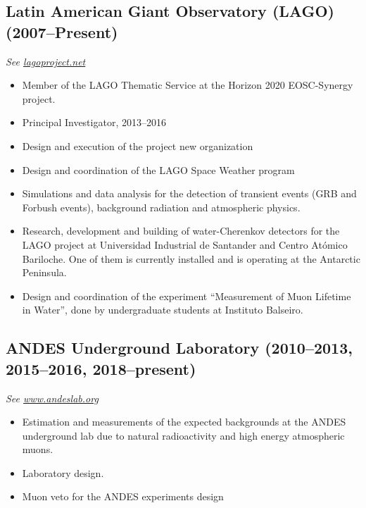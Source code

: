 \subsection*{Latin American Giant Observatory (LAGO) (2007--Present)}
{\small{\textit{See \href{http://lagoproject.net}{lagoproject.net}}}}
\begin{itemize}
\item Member of the LAGO Thematic Service at the Horizon 2020 EOSC-Synergy project.
\item Principal Investigator, 2013--2016
\item Design and execution of the project new organization
\item Design and coordination of the LAGO Space Weather program
\item Simulations and data analysis for the detection of transient events
(GRB and Forbush events), background radiation and atmospheric physics.
\item Research, development and building of water-Cherenkov detectors for the LAGO project at Universidad Industrial de Santander and Centro Atómico Bariloche.
	One of them is currently installed and is operating at the Antarctic Peninsula.
\item Design and coordination of the experiment ``Measurement of Muon Lifetime in Water'', done by undergraduate students at Instituto Balseiro.
\end{itemize}

\subsection*{ANDES Underground Laboratory (2010--2013, 2015--2016, 2018--present)}
{\small{\textit{See \href{http://www.andeslab.org}{www.andeslab.org}}}}
\begin{itemize}
\item Estimation and measurements of the expected backgrounds at the ANDES
underground lab due to natural radioactivity and high energy atmospheric muons.
\item Laboratory design.
\item Muon veto for the ANDES experiments design
\end{itemize}

\ifres
\else
